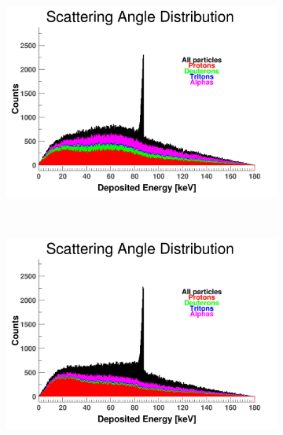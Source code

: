 \documentclass[10pt,a4paper]{report}
\begin{document}
\begin{figure}[htbp]
    \begin{subfigure}[htbp]{0.42\textwidth}
        \label{fig:A3}
        \includegraphics[width=\textwidth]{./A3_QGSP_INCLXX_HP_Scat.png}
    \end{subfigure}
    ~ 
    \begin{subfigure}[htbp]{0.42\textwidth}
        \label{fig:A4}
        \includegraphics[width=\textwidth]{./A4_QGSP_BERT_HP_Scat.png}
    \end{subfigure}
    
    \vspace{1mm}
    

\end{figure}
\end{document}
